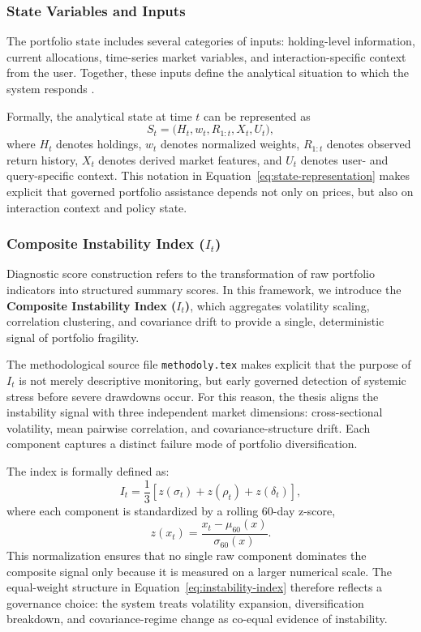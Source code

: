 \documentclass[11pt]{article}
\begin{document}
\subsubsection{State Variables and Inputs}
The portfolio state includes several categories of inputs: holding-level information, current allocations, time-series market variables, and interaction-specific context from the user. Together, these inputs define the analytical situation to which the system responds \cite{wu2023,yu2023}.

Formally, the analytical state at time $t$ can be represented as
\begin{equation}
\label{eq:state-representation}
S_t = \bigl(H_t, w_t, R_{1:t}, X_t, U_t\bigr),
\end{equation}
where $H_t$ denotes holdings, $w_t$ denotes normalized weights, $R_{1:t}$ denotes observed return history, $X_t$ denotes derived market features, and $U_t$ denotes user- and query-specific context. This notation in Equation~\eqref{eq:state-representation} makes explicit that governed portfolio assistance depends not only on prices, but also on interaction context and policy state.

\subsubsection{Composite Instability Index ($I_t$)}
Diagnostic score construction refers to the transformation of raw portfolio indicators into structured summary scores. In this framework, we introduce the \textbf{Composite Instability Index ($I_t$)}, which aggregates volatility scaling, correlation clustering, and covariance drift to provide a single, deterministic signal of portfolio fragility.

The methodological source file \texttt{methodoly.tex} makes explicit that the purpose of $I_t$ is not merely descriptive monitoring, but early governed detection of systemic stress before severe drawdowns occur. For this reason, the thesis aligns the instability signal with three independent market dimensions: cross-sectional volatility, mean pairwise correlation, and covariance-structure drift. Each component captures a distinct failure mode of portfolio diversification.

The index is formally defined as:
\begin{equation}
\label{eq:instability-index}
I_t = \frac{1}{3} \left[z(\sigma_t) + z(\rho_t) + z(\delta_t)\right],
\end{equation}
where each component is standardized by a rolling 60-day z-score,
\begin{equation}
\label{eq:zscore-component}
z(x_t) = \frac{x_t - \mu_{60}(x)}{\sigma_{60}(x)}.
\end{equation}
This normalization ensures that no single raw component dominates the composite signal only because it is measured on a larger numerical scale. The equal-weight structure in Equation~\eqref{eq:instability-index} therefore reflects a governance choice: the system treats volatility expansion, diversification breakdown, and covariance-regime change as co-equal evidence of instability.
\end{document}
